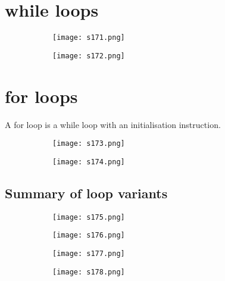 \documentclass[8pt]{extreport}
\begin{document}
\section{while loops}
\begin{figure}[H]
\centering
\begin{subfigure}[b]{0.4\linewidth}
\texttt{[image: s171.png]}
\end{subfigure}
\begin{subfigure}[b]{0.4\linewidth}
\texttt{[image: s172.png]}
\end{subfigure}
\end{figure}

\section{for loops}
A for loop is a while loop with an initialisation instruction.
\begin{figure}[H]
\centering
\begin{subfigure}[b]{0.4\linewidth}
\texttt{[image: s173.png]}
\end{subfigure}
\begin{subfigure}[b]{0.4\linewidth}
\texttt{[image: s174.png]}
\end{subfigure}
\end{figure}

\subsection{Summary of loop variants}
\begin{figure}[H]
\centering
\begin{subfigure}[b]{0.4\linewidth}
\texttt{[image: s175.png]}
\end{subfigure}
\begin{subfigure}[b]{0.4\linewidth}
\texttt{[image: s176.png]}
\end{subfigure}
\begin{subfigure}[b]{0.4\linewidth}
\texttt{[image: s177.png]}
\end{subfigure}
\begin{subfigure}[b]{0.4\linewidth}
\texttt{[image: s178.png]}
\end{subfigure}
\end{figure}
\end{document}
